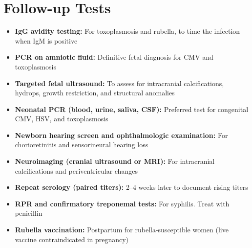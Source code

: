 \section*{Follow-up Tests}
\begin{itemize}
  \item \textbf{IgG avidity testing:} For toxoplasmosis and rubella, to time the infection when IgM is positive
  \item \textbf{PCR on amniotic fluid:} Definitive fetal diagnosis for CMV and toxoplasmosis
  \item \textbf{Targeted fetal ultrasound:} To assess for intracranial calcifications, hydrops, growth restriction, and structural anomalies
  \item \textbf{Neonatal PCR (blood, urine, saliva, CSF):} Preferred test for congenital CMV, HSV, and toxoplasmosis
  \item \textbf{Newborn hearing screen and ophthalmologic examination:} For chorioretinitis and sensorineural hearing loss
  \item \textbf{Neuroimaging (cranial ultrasound or MRI):} For intracranial calcifications and periventricular changes
  \item \textbf{Repeat serology (paired titers):} 2--4 weeks later to document rising titers
  \item \textbf{RPR and confirmatory treponemal tests:} For syphilis. Treat with penicillin
  \item \textbf{Rubella vaccination:} Postpartum for rubella-susceptible women (live vaccine contraindicated in pregnancy)
\end{itemize}

